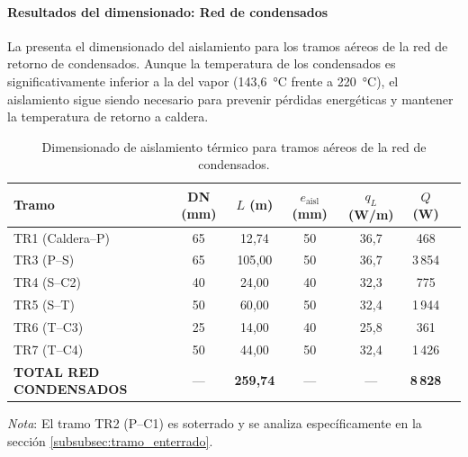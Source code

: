 \documentclass[12pt]{article}
\begin{document}
\paragraph{Resultados del dimensionado: Red de condensados}
\label{par:resultados_cond_aereo}

La  presenta el dimensionado del aislamiento para los tramos aéreos de la red de retorno de condensados. Aunque la temperatura de los condensados es significativamente inferior a la del vapor (143{,}6~°C frente a 220~°C), el aislamiento sigue siendo necesario para prevenir pérdidas energéticas y mantener la temperatura de retorno a caldera.

\begin{table}[htbp]
	\centering
	\normalsize
	\setlength{\tabcolsep}{3pt}
	\caption{Dimensionado de aislamiento térmico para tramos aéreos de la red de condensados.}
	\label{tab:aislamiento_cond_aereo}
	\begin{tabular}{lcccccc}
		\toprule
		\textbf{Tramo}                 & \textbf{DN (mm)} & \textbf{$L$ (m)}  & \textbf{$e_{\text{aisl}}$ (mm)} & \textbf{$q_L$ (W/m)} & \textbf{$Q$ (W)} \\
		\midrule
		TR1 (Caldera--P)               & 65               & 12{,}74           & 50                              & 36{,}7               & 468              \\
		TR3 (P--S)                     & 65               & 105{,}00          & 50                              & 36{,}7               & 3\,854           \\
		TR4 (S--C2)                 & 40               & 24{,}00           & 40                              & 32{,}3               & 775              \\
		TR5 (S--T)                     & 50               & 60{,}00           & 50                              & 32{,}4               & 1\,944           \\
		TR6 (T--C3)                 & 25               & 14{,}00           & 40                              & 25{,}8               & 361              \\
		TR7 (T--C4)                 & 50               & 44{,}00           & 50                              & 32{,}4               & 1\,426           \\
		\midrule
		\textbf{TOTAL RED CONDENSADOS} & ---              & \textbf{259{,}74} & ---                             & ---                  & \textbf{8\,828}  \\
		\bottomrule
	\end{tabular}
	
	\vspace{0.3cm}

	\noindent \small \textit{Nota}: El tramo TR2 (P--C1) es soterrado y se analiza específicamente en la sección \ref{subsubsec:tramo_enterrado}.
\end{table}
\end{document}

